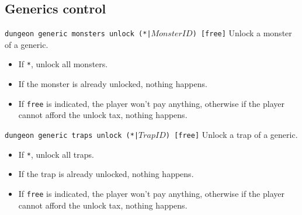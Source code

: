\documentclass[10pt,a4paper]{scrartcl}
\newenvironment{apiCode}[1]
{ \begin{lrbox}{\mybox} \begin{minipage}{0.9\textwidth} {\color{Mahogany} \small\texttt{#1}} \vspace{8pt} \newline }
{ \end{minipage} \end{lrbox}\fbox{\usebox{\mybox}} \newline\vspace{4pt}\newline }
\begin{document}
\subsection{Generics control}
\begin{apiCode}{dungeon generic monsters unlock (*|$MonsterID$) [free]}
Unlock a monster of a generic.
\begin{itemize}
\itemsep 0em
\item If \verb#*#, unlock all monsters.
\item If the monster is already unlocked, nothing happens.
\item If \verb#free# is indicated, the player won't pay anything,\newline
	  otherwise if the player cannot afford the unlock tax, nothing happens.
\end{itemize}
\end{apiCode}
\begin{apiCode}{dungeon generic traps unlock (*|$TrapID$) [free]}
Unlock a trap of a generic.
\begin{itemize}
\itemsep 0em
\item If \verb#*#, unlock all traps.
\item If the trap is already unlocked, nothing happens.
\item If \verb#free# is indicated, the player won't pay anything,\newline
	  otherwise if the player cannot afford the unlock tax, nothing happens.
\end{itemize}
\end{apiCode}
\end{document}
